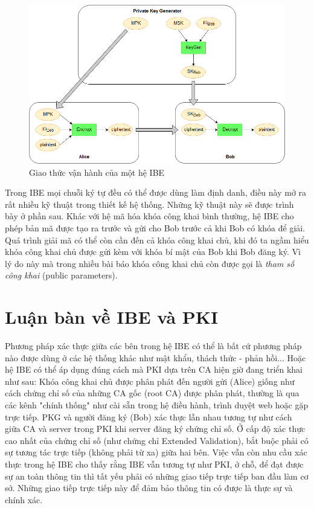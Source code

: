 \documentclass[class=report, crop=false]{standalone}
\begin{document}
		\begin{figure}[h]
			\captionsetup{font=normalsize}
			\includegraphics[width=\textwidth]{ibe_protocol.png}
			\centering
			\caption{Giao thức vận hành của một hệ IBE}
		\end{figure}
		\newpage
		Trong IBE mọi chuỗi ký tự đều có thể được dùng làm định danh, điều này mở ra rất nhiều kỹ thuật trong thiết kế hệ thống. Những kỹ thuật này sẽ được trình bày ở phần sau. Khác với hệ mã hóa khóa công khai bình thường, hệ IBE cho phép bản mã được tạo ra trước và gửi cho Bob trước cả khi Bob có khóa để giải. Quá trình giải mã có thể còn cần đến cả khóa công khai chủ, khi đó ta ngầm hiểu khóa công khai chủ được gửi kèm với khóa bí mật của Bob khi Bob đăng ký. Vì lý do này mà trong nhiều bài báo khóa công khai chủ còn được gọi là \textit{tham số công khai} (public parameters).
	\section{Luận bàn về IBE và PKI}\label{ibe_vs_pki}
		Phương pháp xác thực giữa các bên trong hệ IBE có thể là bất cứ phương pháp nào được dùng ở các hệ thống khác như mật khẩu, thách thức - phản hồi... Hoặc hệ IBE có thể áp dụng đúng cách mà PKI dựa trên CA hiện giờ đang triển khai như sau: Khóa công khai chủ được phân phát đến người gửi (Alice) giống như cách chứng chỉ số của những CA gốc (root CA) được phân phát, thường là qua các kênh "chính thống" như cài sẵn trong hệ điều hành, trình duyệt web hoặc gặp trực tiếp. PKG và người đăng ký (Bob) xác thực lẫn nhau tương tự như cách giữa CA và server trong PKI khi server đăng ký chứng chỉ số. Ở cấp độ xác thực cao nhất của chứng chỉ số (như chứng chỉ Extended Validation), bắt buộc phải có sự tương tác trực tiếp (không phải từ xa) giữa hai bên. Việc vẫn còn nhu cầu xác thực trong hệ IBE cho thấy rằng IBE vẫn tương tự như PKI, ở chỗ, để đạt được sự an toàn thông tin thì tất yếu phải có những giao tiếp trực tiếp ban đầu làm cơ sở. Những giao tiếp trực tiếp này để đảm bảo thông tin có được là thực sự và chính xác.
		
\end{document}
